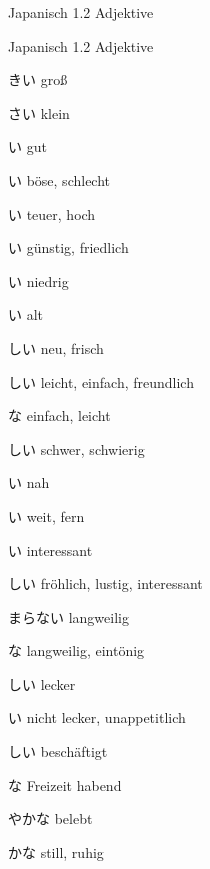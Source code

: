 \noindent
\centering
Japanisch 1.2 Adjektive

\begin{multicols*}{2}
\begin{flushleft}
\begin{labeling}{Japanisch 1.2 Adjektive}
	\item [\ruby{大}{おお}きい] groß
	\item [\ruby{小}{ちい}さい] klein
	
	\item [\ruby{良}{い}い] gut
	\item [\ruby{悪}{わる}い] böse, schlecht
	
	\item [\ruby{高}{たか}い] teuer, hoch
	\item [\ruby{安}{やす}い] günstig, friedlich
	\item [\ruby{低}{ひく}い] niedrig
	
	\item [\ruby{古}{ふる}い] alt
	\item [\ruby{新}{あたら}しい] neu, frisch
	
	\item [\ruby{易}{やさ}しい] leicht, einfach, freundlich
	\item [\ruby{簡単}{かんたん}な] einfach, leicht
	\item [\ruby{難}{むずか}しい] schwer, schwierig
	
	\item [\ruby{近}{ちか}い] nah
	\item [\ruby{遠}{とお}い] weit, fern
	
	\item [\ruby{面白}{おもしろ}い] interessant
	\item [\ruby{楽}{たの}しい] fröhlich, lustig, interessant
	\item [\ruby{詰}{つ}まらない] langweilig
	\item [\ruby{退屈}{たいくつ}な] langweilig, eintönig
	
	\item [\ruby{美味}{おい}しい] lecker
	\item [\ruby{不味}{まず}い] nicht lecker, unappetitlich
	
	\item [\ruby{忙}{いそが}しい] beschäftigt
	\item [\ruby{暇}{ひま}な	] Freizeit habend
	
	\item [\ruby{賑}{にぎ}やかな] belebt
	\item [\ruby{静}{しず}かな] still, ruhig
	

\end{labeling}
\end{flushleft}
\end{multicols*}
